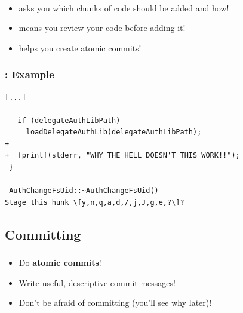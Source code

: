 
\begin{frame}
  \frametitle{\insertsubsection}

  \vspace{20pt}\\

  \begin{itemize}
    \item asks you which chunks of code should be added and how!
    \item means you review your code before adding it!
    \item helps you create atomic commits!
  \end{itemize}
\end{frame}


\begin{frame}[fragile]
  \frametitle{\insertsubsection: Example}

  \begin{small}
\begin{verbatim}
[...]

   if (delegateAuthLibPath)
     loadDelegateAuthLib(delegateAuthLibPath);
+
+  fprintf(stderr, "WHY THE HELL DOESN'T THIS WORK!!");
 }

 AuthChangeFsUid::~AuthChangeFsUid()
Stage this hunk \[y,n,q,a,d,/,j,J,g,e,?\]?
\end{verbatim}
  \end{small}

\end{frame}


\subsection{Committing}

\begin{frame}

  \begin{center}
    \textbf{\Huge{\insertsubsection}}
  \end{center}

\end{frame}


\begin{frame}
  \frametitle{\insertsubsection}

  \begin{center}
    \begin{itemize}
      \item Do \textbf{atomic commits}!
      \item Write useful, descriptive commit messages!
      \item Don't be afraid of committing (you'll see why later)!
    \end{itemize}
  \end{center}

\end{frame}

